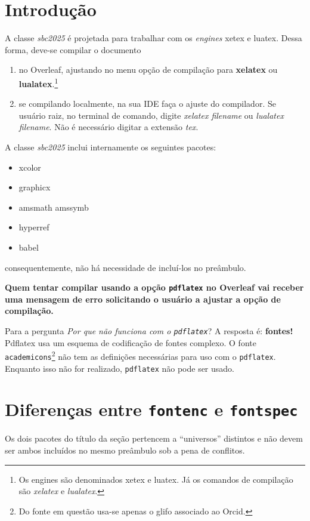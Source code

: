 \documentclass[portuguese]{sbc2025}%
\begin{document}
\section{Introdução}
\label{sec:intro}

A classe \textsl{sbc2025} é projetada para trabalhar com os \textit{engines} xetex e luatex. Dessa forma, deve-se compilar o documento 
\begin{enumerate}
    \item no Overleaf, ajustando no menu opção de compilação para \textbf{xelatex} ou \textbf{lualatex}.\footnote{Os engines são denominados xetex e luatex. Já os comandos de compilação são \textsl{xelatex} e \textsl{lualatex}.}
    \item se compilando localmente, na sua IDE faça o ajuste do compilador. Se usuário raiz, no terminal de comando, digite \textsl{xelatex filename} ou \textsl{lualatex filename}. Não é necessário digitar a extensão \textsl{tex}.
\end{enumerate}

A classe \textsl{sbc2025} inclui internamente os seguintes pacotes:
\begin{itemize}
    \item xcolor
    \item graphicx
    \item amsmath amssymb
    \item hyperref
    \item babel
\end{itemize}
\noindent consequentemente, não há necessidade de incluí-los no preâmbulo.

{\bfseries Quem tentar compilar usando a opção \texttt{pdflatex} no Overleaf vai receber uma mensagem de erro solicitando o usuário a ajustar a opção de compilação.}

Para a pergunta \textit{Por que não funciona com o \texttt{pdflatex}}?  
A resposta é: \textbf{fontes!} Pdflatex usa um esquema de codificação de fontes complexo. O fonte \texttt{academicons}\footnote{Do fonte em questão usa-se apenas o glifo associado ao Orcid.} não tem as definições necessárias para uso com o \texttt{pdflatex}. Enquanto isso não for realizado, \texttt{pdflatex} não pode ser usado. 

\section{Diferenças entre \texttt{fontenc} e \texttt{fontspec}}

Os dois pacotes do título da seção pertencem a ``universos'' distintos e não devem ser ambos incluídos no mesmo preâmbulo sob a pena de conflitos.
\end{document}
